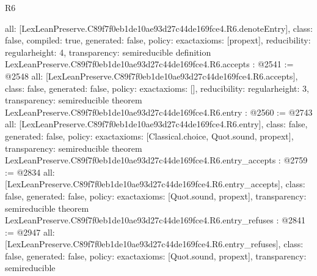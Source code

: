\begin{lexlean}{R6}
\begin{coremodule}
{  all: [LexLeanPreserve.C89f7f0eb1de10ae93d27c44de169fce4.R6.denoteEntry],
  class: false,
  compiled: true,
  generated: false,
  policy: exact{axioms: [propext]},
  reducibility: regular{height: 4},
  transparency: semireducible
}
definition LexLeanPreserve.C89f7f0eb1de10ae93d27c44de169fce4.R6.accepts : @2541 := @2548 {
  all: [LexLeanPreserve.C89f7f0eb1de10ae93d27c44de169fce4.R6.accepts],
  class: false,
  generated: false,
  policy: exact{axioms: []},
  reducibility: regular{height: 3},
  transparency: semireducible
}
theorem LexLeanPreserve.C89f7f0eb1de10ae93d27c44de169fce4.R6.entry : @2560 := @2743 {
  all: [LexLeanPreserve.C89f7f0eb1de10ae93d27c44de169fce4.R6.entry],
  class: false,
  generated: false,
  policy: exact{axioms: [Classical.choice, Quot.sound, propext]},
  transparency: semireducible
}
theorem LexLeanPreserve.C89f7f0eb1de10ae93d27c44de169fce4.R6.entry_accepts : @2759 := @2834 {
  all: [LexLeanPreserve.C89f7f0eb1de10ae93d27c44de169fce4.R6.entry_accepts],
  class: false,
  generated: false,
  policy: exact{axioms: [Quot.sound, propext]},
  transparency: semireducible
}
theorem LexLeanPreserve.C89f7f0eb1de10ae93d27c44de169fce4.R6.entry_refuses : @2841 := @2947 {
  all: [LexLeanPreserve.C89f7f0eb1de10ae93d27c44de169fce4.R6.entry_refuses],
  class: false,
  generated: false,
  policy: exact{axioms: [Quot.sound, propext]},
  transparency: semireducible
}


\end{coremodule}
\end{lexlean}
